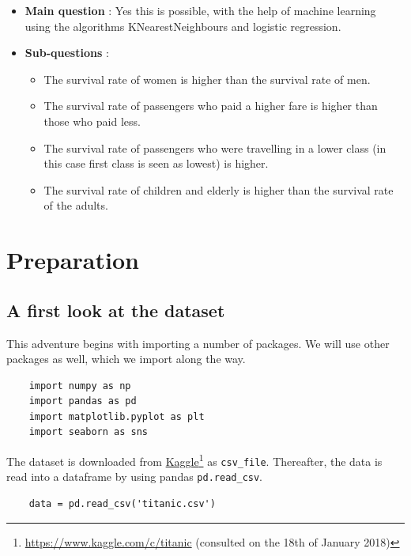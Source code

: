 \documentclass[11pt]{article}
\begin{document}
\begin{itemize}
\item \textbf{Main question} : Yes this is possible, with the help of machine learning using the algorithms KNearestNeighbours and logistic regression.
\item \textbf{Sub-questions} :

\begin{itemize}
\item The survival rate of women is higher than the survival rate of men.
\item The survival rate of passengers who paid a higher fare is higher than those who paid less.
\item The survival rate of passengers who were travelling in a lower class (in this case first class is seen as lowest) is higher.
\item The survival rate of children and elderly is higher than the survival rate of the adults.
\end{itemize}
\end{itemize}


\newpage
\section{Preparation}
\label{sec:org46f131b}

\subsection{A first look at the dataset}
\label{sec:orgdba3d61}

This adventure begins with importing a number of packages. We will use other packages as well, which we import along the way.

\begin{verbatim}
    import numpy as np
    import pandas as pd
    import matplotlib.pyplot as plt
    import seaborn as sns
\end{verbatim}

The dataset is downloaded from \href{https://www.kaggle.com/c/titanic/data}{Kaggle}\footnote{\url{https://www.kaggle.com/c/titanic} (consulted on the 18th of January 2018)} as \texttt{csv\_file}. Thereafter, the data is read into a dataframe by using pandas \texttt{pd.read\_csv}. 

\begin{verbatim}
    data = pd.read_csv('titanic.csv')
\end{verbatim}
\end{document}
